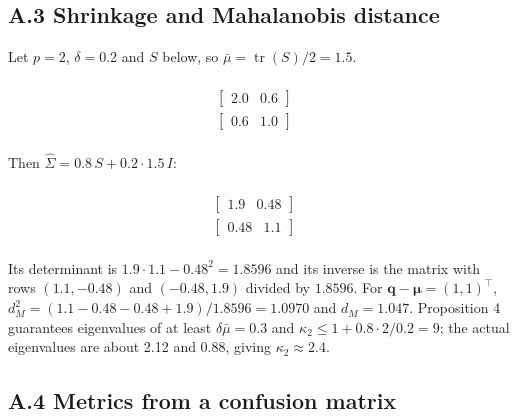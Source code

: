 \documentclass[11pt,a4paper]{article}
\begin{document}
\subsection{A.3 Shrinkage and Mahalanobis distance}

Let $p = 2$, $\delta = 0.2$ and $S$ below, so $\bar{\mu} = \operatorname{tr}(S)/2 = 1.5$.

\begin{table}[t]
\centering
\[\begin{array}{cc}
 &  \\
\left[\begin{matrix} 2.0 & 0.6 \end{matrix}\right] \\
\left[\begin{matrix} 0.6 & 1.0 \end{matrix}\right] \\
\end{array}\]
\caption{Sample covariance $S$.}
\end{table}

Then $\hat{\Sigma} = 0.8\,S + 0.2 \cdot 1.5\, I$:

\begin{table}[t]
\centering
\[\begin{array}{cc}
 &  \\
\left[\begin{matrix} 1.9 & 0.48 \end{matrix}\right] \\
\left[\begin{matrix} 0.48 & 1.1 \end{matrix}\right] \\
\end{array}\]
\caption{Shrunk covariance $\hat{\Sigma}$.}
\end{table}

Its determinant is $1.9 \cdot 1.1 - 0.48^2 = 1.8596$ and its inverse is the matrix with rows $(1.1, -0.48)$ and $(-0.48, 1.9)$ divided by $1.8596$. For $\mathbf{q} - \boldsymbol{\mu} = (1, 1)^{\top}$, $d_M^2 = (1.1 - 0.48 - 0.48 + 1.9)/1.8596 = 1.0970$ and $d_M = 1.047$. Proposition 4 guarantees eigenvalues of at least $\delta\bar{\mu} = 0.3$ and $\kappa_2 \le 1 + 0.8 \cdot 2/0.2 = 9$; the actual eigenvalues are about 2.12 and 0.88, giving $\kappa_2 \approx 2.4$.

\subsection{A.4 Metrics from a confusion matrix}
\end{document}
